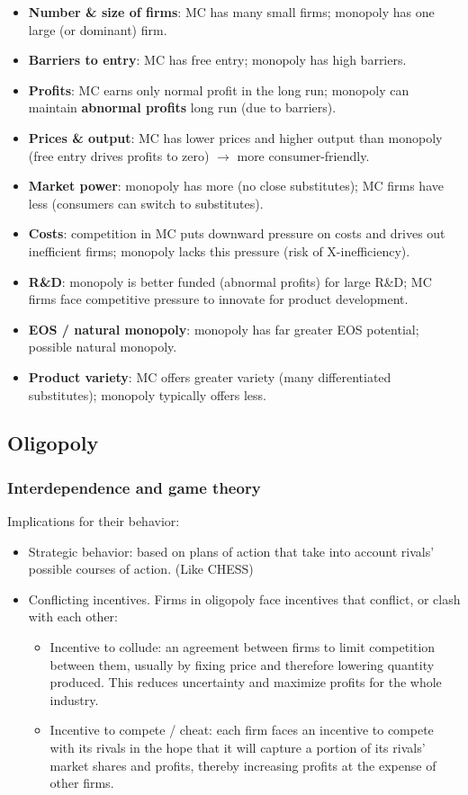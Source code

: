 \documentclass[a4paper,12pt]{article}
\begin{document}
\begin{itemize}
  \item \textbf{Number \& size of firms}: MC has many small firms; monopoly has one large (or dominant) firm.
  \item \textbf{Barriers to entry}: MC has free entry; monopoly has high barriers.
  \item \textbf{Profits}: MC earns only normal profit in the long run; monopoly can maintain \textbf{abnormal profits} long run (due to barriers).
  \item \textbf{Prices \& output}: MC has lower prices and higher output than monopoly (free entry drives profits to zero) $\to$ more consumer-friendly.
  \item \textbf{Market power}: monopoly has more (no close substitutes); MC firms have less (consumers can switch to substitutes).
  \item \textbf{Costs}: competition in MC puts downward pressure on costs and drives out inefficient firms; monopoly lacks this pressure (risk of X-inefficiency).
  \item \textbf{R\&D}: monopoly is better funded (abnormal profits) for large R\&D; MC firms face competitive pressure to innovate for product development.
  \item \textbf{EOS / natural monopoly}: monopoly has far greater EOS potential; possible natural monopoly.
  \item \textbf{Product variety}: MC offers greater variety (many differentiated substitutes); monopoly typically offers less.
\end{itemize}
\subsection{Oligopoly}
\subsubsection*{Interdependence and game theory}
Implications for their behavior:
\begin{itemize}
  \item Strategic behavior: based on plans of action that take into account rivals' possible courses of action. (Like CHESS) 
  \item Conflicting incentives. Firms in oligopoly face incentives that conflict, or clash with each other:
  \begin{itemize}
    \item Incentive to collude: an agreement between firms to limit competition between them, usually by fixing price and therefore lowering quantity produced. This reduces uncertainty and maximize profits for the whole industry.
    \item Incentive to compete / cheat: each firm faces an incentive to compete with its rivals in the hope that it will capture a portion of its rivals’ market shares and profits, thereby increasing profits at the expense of other firms. 
  \end{itemize}
\end{itemize}
\end{document}
